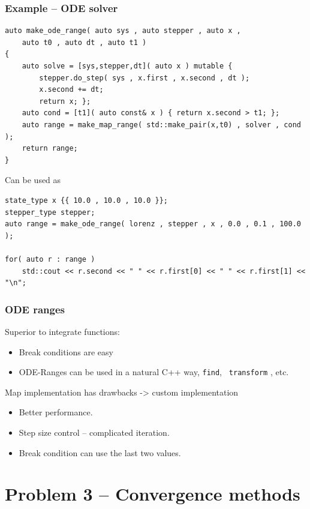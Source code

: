 \documentclass{beamer}
\newcommand{\heading}[1]{\frametitle{#1}}
\begin{document}
\begin{frame}[fragile]
 \heading{Example -- ODE solver}
 
 \begin{lstlisting}[basicstyle=\tiny\ttfamily]
auto make_ode_range( auto sys , auto stepper , auto x ,
    auto t0 , auto dt , auto t1 )
{
    auto solve = [sys,stepper,dt]( auto x ) mutable { 
        stepper.do_step( sys , x.first , x.second , dt );
        x.second += dt;
        return x; };
    auto cond = [t1]( auto const& x ) { return x.second > t1; };
    auto range = make_map_range( std::make_pair(x,t0) , solver , cond );
    return range;
}
 \end{lstlisting}
 
 Can be used as
\begin{lstlisting}[basicstyle=\tiny\ttfamily]
state_type x {{ 10.0 , 10.0 , 10.0 }};
stepper_type stepper;
auto range = make_ode_range( lorenz , stepper , x , 0.0 , 0.1 , 100.0 );

for( auto r : range )
    std::cout << r.second << " " << r.first[0] << " " << r.first[1] << "\n"; 
\end{lstlisting}

\end{frame}

\begin{frame}[fragile]
 \heading{ODE ranges}
 
 Superior to integrate functions:
 \begin{itemize}
  \item Break conditions are easy
  \item ODE-Ranges can be used in a natural C++ way, {\tt find}, {\tt 
transform} , etc.
 \end{itemize}
 
 Map implementation has drawbacks -> custom implementation
 \begin{itemize}
  \item Better performance.
  \item Step size control -- complicated iteration.
  \item Break condition can use the last two values.
 \end{itemize}

\end{frame}




\section{Problem 3 -- Convergence methods}
\end{document}
